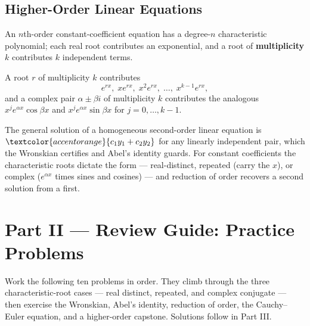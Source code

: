 \subsection{Higher-Order Linear Equations}

An $n$th-order constant-coefficient equation has a degree-$n$ characteristic
polynomial; each real root contributes an exponential, and a root of
\textbf{multiplicity} $k$ contributes $k$ independent terms.

\begin{formulabox}
A root $r$ of multiplicity $k$ contributes
\[ e^{r x},\; x e^{r x},\; x^2 e^{r x},\; \ldots,\; x^{k-1} e^{r x}, \]
and a complex pair $\alpha\pm\beta i$ of multiplicity $k$ contributes the analogous
$x^j e^{\alpha x}\cos\beta x$ and $x^j e^{\alpha x}\sin\beta x$ for $j=0,\ldots,k-1$.
\end{formulabox}

\begin{conceptbox}
The general solution of a homogeneous second-order linear equation is
$\textcolor{accentorange}{c_1 y_1 + c_2 y_2}$ for any
\textcolor{accentorange}{linearly independent} pair, which the
\textcolor{accentorange}{Wronskian} certifies and \textcolor{accentorange}{Abel's
identity} guards. For constant coefficients the
\textcolor{accentorange}{characteristic roots} dictate the form ---
\textcolor{accentorange}{real-distinct}, \textcolor{accentorange}{repeated}
(carry the $x$), or \textcolor{accentorange}{complex} ($e^{\alpha x}$ times sines
and cosines) --- and \textcolor{accentorange}{reduction of order} recovers a second
solution from a first.
\end{conceptbox}

\clearpage
{}
{}
\section*{Part II --- Review Guide: Practice Problems}

Work the following ten problems in order. They climb through the three
characteristic-root cases --- real distinct, repeated, and complex conjugate ---
then exercise the Wronskian, Abel's identity, reduction of order, the
Cauchy--Euler equation, and a higher-order capstone. Solutions follow in
Part III.

